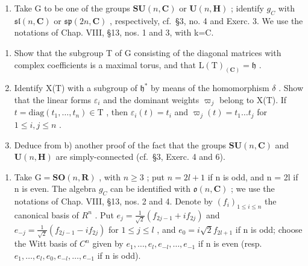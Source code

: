 
\begin{enumerate}
\def\labelenumi{\arabic{enumi})}
\tightlist
\item
  Take G to be one of the groups \(\mathbf{SU}(n,\mathbf{C})\) or \(\mathbf{U}(n,\mathbf{H})\) ; identify \(g_{C}\) with \(\mathfrak{sl}(n,\mathbf{C})\) or \(\mathfrak{sp}(2n,\mathbf{C})\) , respectively, cf.~§3, no. 4 and Exerc. 3. We use the notations of Chap. VIII, §13, nos. 1 and 3, with k=C.
\end{enumerate}

\begin{enumerate}
\def\labelenumi{\alph{enumi})}
\item
  Show that the subgroup T of G consisting of the diagonal matrices with complex coefficients is a maximal torus, and that \(\mathrm{L}(\mathrm{T})_{(\mathbf{C})} = \mathfrak{h}\) .
\item
  Identify X(T) with a subgroup of \(\mathfrak{h}^*\) by means of the homomorphism \(\delta\) . Show that the linear forms \(\varepsilon_i\) and the dominant weights \(\varpi_j\) belong to X(T). If \(t = \mathrm{diag}(t_1, \ldots, t_n) \in \mathrm{T}\) , then \(\varepsilon_i(t) = t_i\) and \(\varpi_j(t) = t_1 \ldots t_j\) for \(1 \leq i, j \leq n\) .
\item
  Deduce from b) another proof of the fact that the groups \(\mathbf{SU}(n,\mathbf{C})\) and \(\mathbf{U}(n,\mathbf{H})\) are simply-connected (cf.~§3, Exerc. 4 and 6).
\end{enumerate}

\begin{enumerate}
\def\labelenumi{\arabic{enumi})}
\setcounter{enumi}{1}
\tightlist
\item
  Take \(\mathrm{G} = \mathbf{SO}(n, \mathbf{R})\) , with \(n \geq 3\) ; put \(n = 2l + 1\) if n is odd, and n = 2l if n is even. The algebra \(g_{C}\) can be identified with \(\mathfrak{o}(n, \mathbf{C})\) ; we use the notations of Chap. VIII, §13, nos. 2 and 4. Denote by \((f_i)_{1 \leq i \leq n}\) the canonical basis of \(R^n\) . Put \(e_j = \frac{1}{\sqrt{2}}(f_{2j-1} + if_{2j})\) and \(e_{-j} = \frac{1}{\sqrt{2}}(f_{2j-1} - if_{2j})\) for \(1 \leq j \leq l\) , and \(e_0 = i\sqrt{2}f_{2l+1}\) if n is odd; choose the Witt basis of \(C^n\) given by \(e_1, \ldots, e_l, e_{-l}, \ldots, e_{-1}\) if n is even (resp. \(e_1, \ldots, e_l, e_0, e_{-l}, \ldots, e_{-1}\) if n is odd).
\end{enumerate}

